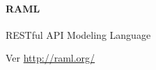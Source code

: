 \paragraph{RAML}
\label{soa:tecnologias:raml}

RESTful API Modeling Language

Ver \url{http://raml.org/}
